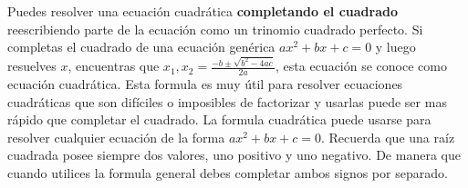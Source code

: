 \documentclass[12pt]{article}
\newcommand{\formulaGeneral}{ $x_1, x_2 = \frac{-b \pm\sqrt{b^2 - 4ac}}{2a}$}
\begin{document}
 Puedes resolver una ecuación cuadrática \textbf{completando el cuadrado} reescribiendo parte de la ecuación como un trinomio cuadrado perfecto. Si completas el cuadrado de una ecuación genérica $ax^2 + bx + c = 0$ y luego resuelves $x$, encuentras que \formulaGeneral, esta ecuación se conoce como ecuación cuadrática. Esta formula es muy útil para resolver ecuaciones cuadráticas que son difíciles o imposibles de factorizar y usarlas puede ser mas rápido que completar el cuadrado. La formula cuadrática puede usarse para resolver cualquier ecuación de la forma $ax^2 + bx + c = 0$.  Recuerda que una raíz cuadrada posee siempre dos valores, uno positivo y uno negativo. De manera que cuando utilices la formula general debes completar ambos signos por separado.\\
 	
 	
\end{document}
